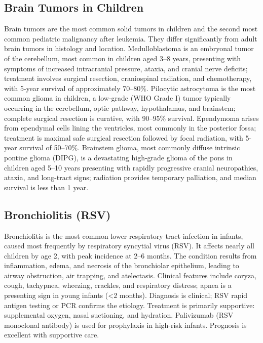 \subsection{Brain Tumors in Children}
\label{sec:Brain Tumors in Children}
Brain tumors are the most common solid tumors in children and the second most common pediatric malignancy after leukemia. They differ significantly from adult brain tumors in histology and location. Medulloblastoma is an embryonal tumor of the cerebellum, most common in children aged 3--8 years, presenting with symptoms of increased intracranial pressure, ataxia, and cranial nerve deficits; treatment involves surgical resection, craniospinal radiation, and chemotherapy, with 5-year survival of approximately 70--80\%. Pilocytic astrocytoma is the most common glioma in children, a low-grade (WHO Grade I) tumor typically occurring in the cerebellum, optic pathway, hypothalamus, and brainstem; complete surgical resection is curative, with 90--95\% survival. Ependymoma arises from ependymal cells lining the ventricles, most commonly in the posterior fossa; treatment is maximal safe surgical resection followed by focal radiation, with 5-year survival of 50--70\%. Brainstem glioma, most commonly diffuse intrinsic pontine glioma (DIPG), is a devastating high-grade glioma of the pons in children aged 5--10 years presenting with rapidly progressive cranial neuropathies, ataxia, and long-tract signs; radiation provides temporary palliation, and median survival is less than 1 year.

\subsection{Bronchiolitis (RSV)}
\label{sec:Bronchiolitis}
Bronchiolitis is the most common lower respiratory tract infection in infants, caused most frequently by respiratory syncytial virus (RSV). It affects nearly all children by age 2, with peak incidence at 2--6 months. The condition results from inflammation, edema, and necrosis of the bronchiolar epithelium, leading to airway obstruction, air trapping, and atelectasis. Clinical features include coryza, cough, tachypnea, wheezing, crackles, and respiratory distress; apnea is a presenting sign in young infants (<2 months). Diagnosis is clinical; RSV rapid antigen testing or PCR confirms the etiology. Treatment is primarily supportive: supplemental oxygen, nasal suctioning, and hydration. Palivizumab (RSV monoclonal antibody) is used for prophylaxis in high-risk infants. Prognosis is excellent with supportive care.

